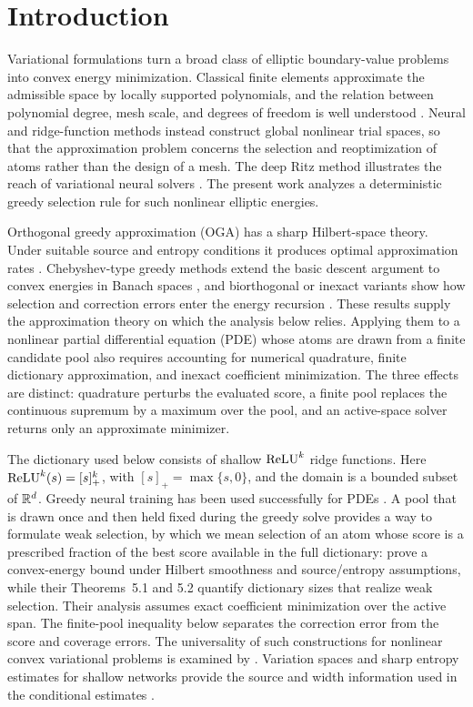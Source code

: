 \section{Introduction}
\label{sec:introduction}

Variational formulations turn a broad class of elliptic boundary-value problems into convex energy
minimization. Classical finite elements approximate the admissible space by locally supported
polynomials, and the relation between polynomial degree, mesh scale, and degrees of freedom is well
understood \citep{BrennerScott2008}. Neural and ridge-function methods instead construct global
nonlinear trial spaces, so that the approximation problem concerns the selection and
reoptimization of atoms rather than the design of a mesh. The deep Ritz method illustrates the
reach of variational neural solvers \citep{EYu2018}. The present work analyzes a deterministic
greedy selection rule for such nonlinear elliptic energies.

Orthogonal greedy approximation (OGA) has a sharp Hilbert-space theory. Under suitable source and
entropy conditions it produces optimal approximation rates
\citep{SiegelXuOGA2022,LiSiegelEntropy2024}. Chebyshev-type greedy methods extend the basic descent
argument to convex energies in Banach spaces \citep{TemlyakovCGA2013,TemlyakovGreedy2014}, and
biorthogonal or inexact variants show how selection and correction errors enter the energy recursion
\citep{DereventsovTemlyakov2022}. These results supply the approximation theory on which the analysis
below relies. Applying them to a nonlinear partial differential equation (PDE) whose atoms are drawn
from a finite candidate pool also requires accounting for numerical quadrature, finite dictionary
approximation, and inexact coefficient minimization. The three effects are distinct: quadrature
perturbs the evaluated score, a finite pool replaces the continuous supremum by a maximum over the
pool, and an active-space solver returns only an approximate minimizer.

The dictionary used below consists of shallow \(\operatorname{ReLU}^k\) ridge functions. Here
\(\operatorname{ReLU}^k(s)=[s]_+^k\), with \([s]_+=\max\{s,0\}\), and the domain is a bounded subset of
\(\mathbb{R}^d\). Greedy neural training has been used successfully for PDEs
\citep{SiegelHongJinHaoXu2023}. A pool that is drawn once and then held fixed during the greedy
solve provides a way to formulate weak selection, by which we mean selection of an atom whose score is a
prescribed fraction of the best score available in the full dictionary:
\cite[Theorem~3.1]{XuXu2025} prove a convex-energy bound under Hilbert smoothness and
source/entropy assumptions, while their Theorems~5.1 and 5.2 quantify dictionary sizes that
realize weak selection. Their analysis assumes exact coefficient minimization over the active
span. The finite-pool inequality below separates the correction error from the score and coverage
errors. The universality of such constructions for nonlinear convex variational problems is
examined by \cite{BernaFalco2025}. Variation spaces and sharp entropy estimates for shallow
networks provide the source and width information used in the conditional estimates
\citep{SiegelXuVariation2023,SiegelXuSharp2024,MaoSiegelXu2026}.

